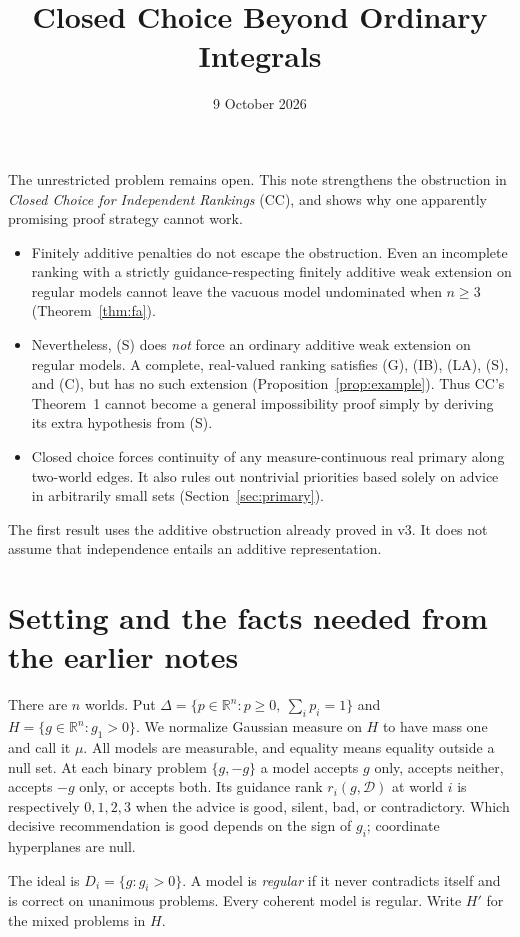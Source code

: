 \documentclass[11pt]{article}
\title{Closed Choice Beyond Ordinary Integrals}
\author{}\date{9 October 2026}
\theoremstyle{remark}\newtheorem{remark}[theorem]{Remark}
\newcommand{\R}{\mathbb R}
\newcommand{\Dscr}{\mathcal D}
\begin{document}
\maketitle

\noindent
The unrestricted problem remains open. This note strengthens the obstruction
in \emph{Closed Choice for Independent Rankings} (CC), and shows why one
apparently promising proof strategy cannot work.
\begin{itemize}[leftmargin=*,itemsep=3pt]
\item Finitely additive penalties do not escape the obstruction. Even an
incomplete ranking with a strictly guidance-respecting finitely additive
weak extension on regular models cannot leave the vacuous model undominated
when $n\ge3$ (Theorem~\ref{thm:fa}).
\item Nevertheless, (S) does \emph{not} force an ordinary additive weak
extension on regular models. A complete, real-valued ranking satisfies
(G), (IB), (LA), (S), and (C), but has no such extension
(Proposition~\ref{prop:example}). Thus CC's Theorem~1 cannot become a general
impossibility proof simply by deriving its extra hypothesis from (S).
\item Closed choice forces continuity of any measure-continuous real primary
along two-world edges. It also rules out nontrivial priorities based solely
on advice in arbitrarily small sets (Section~\ref{sec:primary}).
\end{itemize}
The first result uses the additive obstruction already proved in v3.
It does not assume that independence entails an additive representation.

\section{Setting and the facts needed from the earlier notes}

There are $n$ worlds. Put
$\Delta=\{p\in\R^n:p\ge0,\ \sum_i p_i=1\}$ and
$H=\{g\in\R^n:g_1>0\}$. We normalize Gaussian measure on $H$ to have mass
one and call it $\mu$. All models are measurable, and equality means equality
outside a null set. At each binary problem $\{g,-g\}$ a model accepts $g$
only, accepts neither, accepts $-g$ only, or accepts both. Its guidance rank
$r_i(g,\Dscr)$ at world $i$ is respectively $0,1,2,3$ when the advice is
good, silent, bad, or contradictory. Which decisive recommendation is good
depends on the sign of $g_i$; coordinate hyperplanes are null.

The ideal is $D_i=\{g:g_i>0\}$. A model is \emph{regular} if it never
contradicts itself and is correct on unanimous problems. Every coherent
model is regular. Write $H'$ for the mixed problems in $H$.
\end{document}
